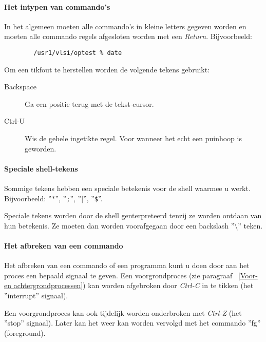 \paragraph{Het intypen van commando's}
\label{Het intypen van commando's}
In het algemeen moeten alle commando's in kleine letters gegeven worden
en moeten alle commando regels afgesloten worden met een {\em Return}.
Bijvoorbeeld:
\begin{verbatim}
        /usr1/vlsi/optest % date
\end{verbatim}
Om een tikfout te herstellen worden de volgende tekens gebruikt:
\begin{description}
\item[Backspace] Ga een positie terug met de tekst-cursor.
\item[Ctrl-U] Wis de gehele ingetikte regel. Voor wanneer het echt 
een puinhoop is geworden.
\end{description}
\paragraph{Speciale shell-tekens}
\label{Speciale shell tekens}
Sommige tekens hebben een speciale betekenis voor de shell
waarmee u werkt.
Bijvoorbeeld: ''{\tt $\ast$}'', ''{\tt ;}'', ''{\tt $|$}'', ''{\tt \$}''. 

Speciale tekens worden door de shell ge{\ii}nterpreteerd tenzij ze worden
ontdaan van hun betekenis. 
Ze moeten dan worden voorafgegaan
door een backslash ''{\tt $\setminus$}'' teken.
\paragraph{Het afbreken van een commando}
Het afbreken van een commando of
een programma kunt u doen door aan het proces een bepaald signaal te geven.
Een voorgrondproces (zie paragraaf ~\ref{Voor- en achtergrondprocessen}) 
kan worden afgebroken door {\em Ctrl-C} in te tikken
(het ''interrupt'' signaal).

Een voorgrondproces kan ook tijdelijk worden onderbroken met {\em Ctrl-Z}
(het ''stop'' signaal).
Later kan het  weer kan worden vervolgd met het
commando ''fg'' (foreground).

